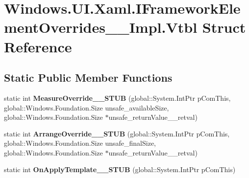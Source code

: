 \hypertarget{struct_windows_1_1_u_i_1_1_xaml_1_1_i_framework_element_overrides_____impl_1_1_vtbl}{}\section{Windows.\+U\+I.\+Xaml.\+I\+Framework\+Element\+Overrides\+\_\+\+\_\+\+Impl.\+Vtbl Struct Reference}
\label{struct_windows_1_1_u_i_1_1_xaml_1_1_i_framework_element_overrides_____impl_1_1_vtbl}
\subsection*{Static Public Member Functions}
\begin{DoxyCompactItemize}
\item 
\mbox{\label{struct_windows_1_1_u_i_1_1_xaml_1_1_i_framework_element_overrides_____impl_1_1_vtbl_a5e90f05f7e53cc029590bf156c3f4fc2}} 
static int {\bfseries Measure\+Override\+\_\+\+\_\+\+S\+T\+UB} (global\+::\+System.\+Int\+Ptr p\+Com\+This, global\+::\+Windows.\+Foundation.\+Size unsafe\+\_\+available\+Size, global\+::\+Windows.\+Foundation.\+Size $\ast$unsafe\+\_\+return\+Value\+\_\+\+\_\+retval)
\item 
\mbox{\label{struct_windows_1_1_u_i_1_1_xaml_1_1_i_framework_element_overrides_____impl_1_1_vtbl_a2177ef78910883f57615b7031eb3275d}} 
static int {\bfseries Arrange\+Override\+\_\+\+\_\+\+S\+T\+UB} (global\+::\+System.\+Int\+Ptr p\+Com\+This, global\+::\+Windows.\+Foundation.\+Size unsafe\+\_\+final\+Size, global\+::\+Windows.\+Foundation.\+Size $\ast$unsafe\+\_\+return\+Value\+\_\+\+\_\+retval)
\item 
\mbox{\label{struct_windows_1_1_u_i_1_1_xaml_1_1_i_framework_element_overrides_____impl_1_1_vtbl_a841071145d85fc2688f3ab08ddfce8e4}} 
static int {\bfseries On\+Apply\+Template\+\_\+\+\_\+\+S\+T\+UB} (global\+::\+System.\+Int\+Ptr p\+Com\+This)
\item 
\mbox{\label{struct_windows_1_1_u_i_1_1_xaml_1_1_i_framework_element_overrides_____impl_1_1_vtbl_a5e90f05f7e53cc029590bf156c3f4fc2}} 

\end{DoxyCompactItemize}
